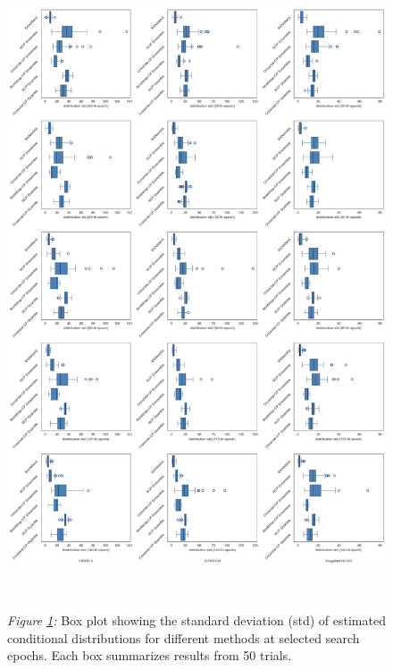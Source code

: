 \documentclass[a4paper,oneside,bibliography=totoc]{scrbook}
\begin{document}
	\vspace{0.7em}
	\begin{figure}[htbp]
		\centering
		\includegraphics[scale=0.4 ]{figs/boxplot.png}
		\label{fig: boxplot}
		\\
 		\parbox{\linewidth}{
 		\vspace{1em}
  		{\small \textit{Figure \ref{fig: boxplot}:} Box plot showing the standard deviation (std) of estimated conditional distributions for different methods at selected search epochs. Each box summarizes results from 50 trials.}
 	 }	
	\end{figure}	
\end{document}
